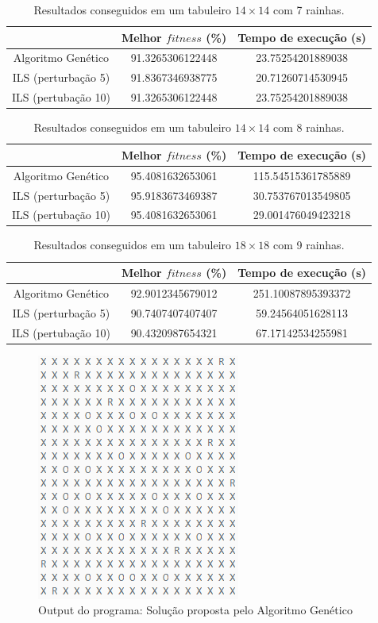 \documentclass[
	article,			%
	11pt,				%
	oneside,			%
	a4paper,			%
	english,			%
	brazil,				%
	sumario=tradicional
	]{abntex2}
\begin{document}
  \begin{table}[ht]
    \caption{Resultados conseguidos em um tabuleiro $14 \times 14$ com 7 rainhas.}
    \centering
    \begin{tabular}{|c|c c|}
      \hline
      & Melhor $fitness$ (\%) & Tempo de execução (s) \\
      \hline
      Algoritmo Genético & 91.3265306122448 & 23.75254201889038 \\
      ILS (perturbação 5) & 91.8367346938775 & 20.71260714530945 \\
      ILS (pertubação 10) & 91.3265306122448 & 23.75254201889038 \\
      \hline
    \end{tabular}
    \label{tabela2}
  \end{table}

\begin{table}[ht]
  \caption{Resultados conseguidos em um tabuleiro $14 \times 14$ com 8 rainhas.}
  \centering
  \begin{tabular}{|c|c c|}
    \hline
     & Melhor $fitness$ (\%) & Tempo de execução (s) \\
     \hline
    Algoritmo Genético & 95.4081632653061 & 115.54515361785889 \\
    ILS (perturbação 5) & 95.9183673469387 & 30.753767013549805 \\
    ILS (pertubação 10) & 95.4081632653061 & 29.001476049423218 \\
    \hline
  \end{tabular}
  \label{tabela3}
\end{table}

\begin{table}[ht]
  \caption{Resultados conseguidos em um tabuleiro $18 \times 18$ com 9 rainhas.}
  \centering
  \begin{tabular}{| c|c c|}
    \hline
     & Melhor $fitness$ (\%) & Tempo de execução (s) \\
     \hline
    Algoritmo Genético & 92.9012345679012 & 251.10087895393372 \\
    ILS (perturbação 5) & 90.7407407407407 & 59.24564051628113 \\
    ILS (pertubação 10) & 90.4320987654321 & 67.17142534255981 \\
    \hline
  \end{tabular}
  \label{tabela4}
\end{table}

\begin{figure}
  \centering
  \includegraphics[width=0.30\linewidth]{gen10_18.png}
  \caption{Output do programa: Solução proposta pelo Algoritmo Genético}
  \label{gen}
\end{figure}
\end{document}
